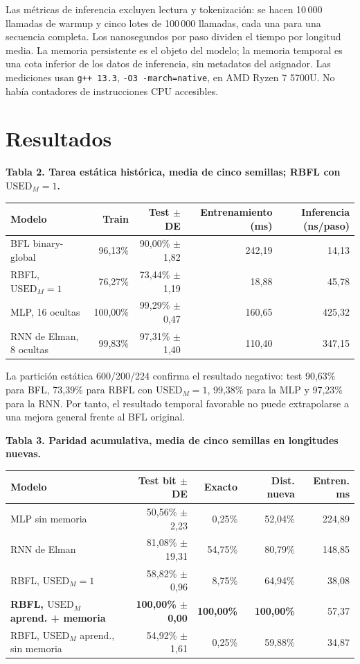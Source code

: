 \documentclass[10pt,a4paper]{article}
\newcommand{\UM}{\mathrm{USED}_{M}}
\newenvironment{fixedtable}[1]{\par\medskip\noindent\begin{minipage}{\linewidth}\centering\small\textbf{#1}\par\smallskip}{\end{minipage}\par\medskip}
\begin{document}
Las métricas de inferencia excluyen lectura y tokenización: se hacen 10\,000 llamadas de warmup y cinco lotes de 100\,000 llamadas, cada una para una secuencia completa. Los nanosegundos por paso dividen el tiempo por longitud media. La memoria persistente es el objeto del modelo; la memoria temporal es una cota inferior de los datos de inferencia, sin metadatos del asignador. Las mediciones usan \texttt{g++ 13.3}, \texttt{-O3 -march=native}, en AMD Ryzen 7 5700U. No había contadores de instrucciones CPU accesibles.

\section{Resultados}
\begin{fixedtable}{Tabla 2. Tarea estática histórica, media de cinco semillas; RBFL con $\UM=1$.}
\begin{tabular}{lrrrr}
\toprule
Modelo & Train & Test $\pm$ DE & Entrenamiento (ms) & Inferencia (ns/paso) \\
\midrule
BFL binary-global & 96,13\% & 90,00\% $\pm$ 1,82 & 242,19 & 14,13 \\
RBFL, $\UM=1$ & 76,27\% & 73,44\% $\pm$ 1,19 & 18,88 & 45,78 \\
MLP, 16 ocultas & 100,00\% & 99,29\% $\pm$ 0,47 & 160,65 & 425,32 \\
RNN de Elman, 8 ocultas & 99,83\% & 97,31\% $\pm$ 1,40 & 110,40 & 347,15 \\
\bottomrule
\end{tabular}
\end{fixedtable}

La partición estática 600/200/224 confirma el resultado negativo: test 90,63\% para BFL, 73,39\% para RBFL con $\UM=1$, 99,38\% para la MLP y 97,23\% para la RNN. Por tanto, el resultado temporal favorable no puede extrapolarse a una mejora general frente al BFL original.

\begin{fixedtable}{Tabla 3. Paridad acumulativa, media de cinco semillas en longitudes nuevas.}
\setlength{\tabcolsep}{3pt}
\begin{tabular}{@{}lrrrr@{}}
\toprule
Modelo & Test bit $\pm$ DE & Exacto & Dist. nueva & Entren. ms \\
\midrule
MLP sin memoria & 50,56\% $\pm$ 2,23 & 0,25\% & 52,04\% & 224,89 \\
RNN de Elman & 81,08\% $\pm$ 19,31 & 54,75\% & 80,79\% & 148,85 \\
RBFL, $\UM=1$ & 58,82\% $\pm$ 0,96 & 8,75\% & 64,94\% & 38,08 \\
\textbf{RBFL, $\UM$ aprend. + memoria} & \textbf{100,00\% $\pm$ 0,00} & \textbf{100,00\%} & \textbf{100,00\%} & 57,37 \\
RBFL, $\UM$ aprend., sin memoria & 54,92\% $\pm$ 1,61 & 0,25\% & 59,88\% & 34,87 \\
\bottomrule
\end{tabular}
\end{fixedtable}
\end{document}
